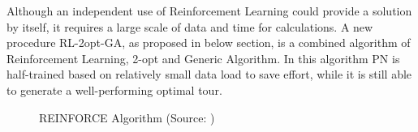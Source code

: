\documentclass[twocolumn]{article}
\begin{document}
Although an independent use of Reinforcement Learning could provide a solution by itself, it requires a large scale of data and time for calculations. A new procedure RL-2opt-GA, as proposed in below section, is a combined algorithm of Reinforcement Learning, 2-opt and Generic Algorithm. In this algorithm PN is half-trained based on relatively small data load to save effort, while it is still able to generate a well-performing optimal tour.

\begin{figure}[h!tb]
\begin{center}
\end{center}
\caption{REINFORCE Algorithm (Source: \cite{bello2016neural})}
\label{fig:rl}
\end{figure}
\end{document}
